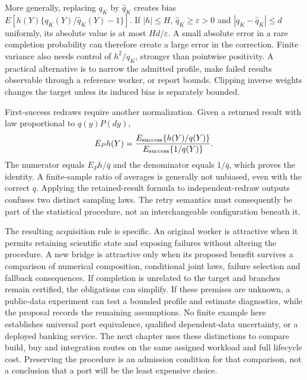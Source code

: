 More generally, replacing $q_K$ by $\widehat q_K$ creates bias
$E[h(Y)\{q_K(Y)/\widehat q_K(Y)-1\}]$. If $|h|\leq H$,
$\widehat q_K\geq\varepsilon>0$ and
$|q_K-\widehat q_K|\leq d$ uniformly, its absolute value is at most
$Hd/\varepsilon$. A small absolute error in a rare completion probability
can therefore create a large error in the correction. Finite variance also
needs control of $h^2/q_K$, stronger than pointwise positivity. A practical
alternative is to narrow the admitted profile, make failed results observable
through a reference worker, or report bounds. Clipping inverse weights changes
the target unless its induced bias is separately bounded.

First-success redraws require another normalization. Given a returned result
with law proportional to $q(y)P(dy)$,
\begin{equation}
 E_P h(Y)=
 \frac{E_{\rm success}\{h(Y)/q(Y)\}}
      {E_{\rm success}\{1/q(Y)\}}.
 \label{exec17:s9-redraw-weighting}
\end{equation}
The numerator equals $E_P h/\bar q$ and the denominator equals $1/\bar q$,
which proves the identity. A finite-sample ratio of averages is generally
not unbiased, even with the correct $q$. Applying the retained-result
formula to independent-redraw outputs confuses two distinct sampling laws.
The retry semantics must consequently be part of the statistical procedure,
not an interchangeable configuration beneath it.

The resulting acquisition rule is specific. An original worker is attractive
when it permits retaining scientific state and exposing failures without
altering the procedure. A new bridge is attractive only when its proposed
benefit survives a comparison of numerical composition, conditional joint
laws, failure selection and fallback consequences. If completion is unrelated
to the target and branches remain certified, the obligations can simplify.
If these premises are unknown, a public-data experiment can test a bounded
profile and estimate diagnostics, while the proposal records the remaining
assumptions. No finite example here establishes universal port equivalence,
qualified dependent-data uncertainty, or a deployed banking service.
The next chapter uses these distinctions to compare build, buy and integration
routes on the same assigned workload and full lifecycle cost. Preserving the
procedure is an admission condition for that comparison, not a conclusion
that a port will be the least expensive choice.

